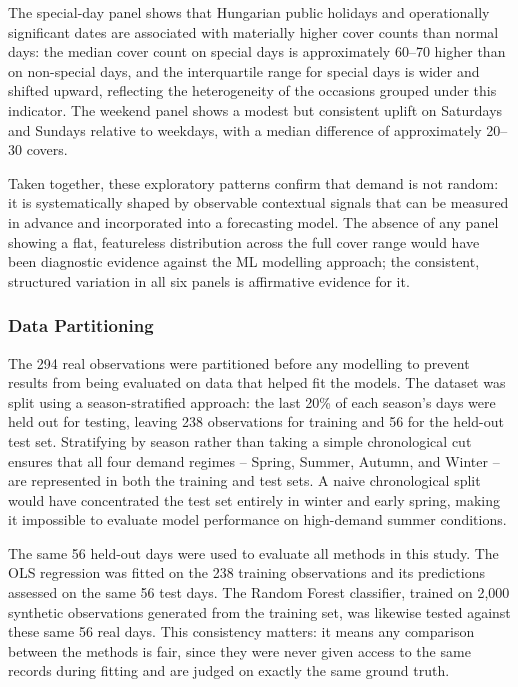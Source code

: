 \documentclass[12pt,a4paper,oneside]{article}
\begin{document}
The special-day panel shows that Hungarian public holidays and operationally significant dates are associated with materially higher cover counts than normal days: the median cover count on special days is approximately 60--70 higher than on non-special days, and the interquartile range for special days is wider and shifted upward, reflecting the heterogeneity of the occasions grouped under this indicator. The weekend panel shows a modest but consistent uplift on Saturdays and Sundays relative to weekdays, with a median difference of approximately 20--30 covers.

Taken together, these exploratory patterns confirm that demand is not random: it is systematically shaped by observable contextual signals that can be measured in advance and incorporated into a forecasting model. The absence of any panel showing a flat, featureless distribution across the full cover range would have been diagnostic evidence against the ML modelling approach; the consistent, structured variation in all six panels is affirmative evidence for it.

\subsubsection{Data Partitioning}
\label{sec:split}

The 294 real observations were partitioned before any modelling to prevent results from being evaluated on data that helped fit the models. The dataset was split using a season-stratified approach: the last 20\% of each season's days were held out for testing, leaving 238 observations for training and 56 for the held-out test set. Stratifying by season rather than taking a simple chronological cut ensures that all four demand regimes -- Spring, Summer, Autumn, and Winter -- are represented in both the training and test sets. A naive chronological split would have concentrated the test set entirely in winter and early spring, making it impossible to evaluate model performance on high-demand summer conditions.

The same 56 held-out days were used to evaluate all methods in this study. The OLS regression was fitted on the 238 training observations and its predictions assessed on the same 56 test days. The Random Forest classifier, trained on 2,000 synthetic observations generated from the training set, was likewise tested against these same 56 real days. This consistency matters: it means any comparison between the methods is fair, since they were never given access to the same records during fitting and are judged on exactly the same ground truth.
\end{document}
